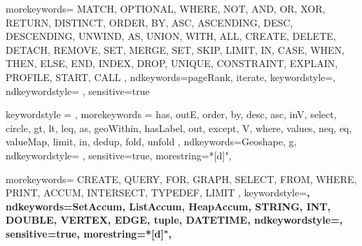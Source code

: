 \lstset{upquote=true}


{
    morekeywords={
		MATCH, OPTIONAL, WHERE, NOT, AND, OR, XOR, RETURN, DISTINCT, ORDER, BY, ASC, ASCENDING, DESC, DESCENDING, UNWIND, AS, UNION, WITH, ALL, CREATE, DELETE, DETACH, REMOVE, SET, MERGE, SET, SKIP, LIMIT, IN, CASE, WHEN, THEN, ELSE, END, INDEX, DROP, UNIQUE, CONSTRAINT, EXPLAIN, PROFILE, START, CALL
	},
    ndkeywords={pageRank, iterate},
    keywordstyle={\color{keyword}\bfseries},
    ndkeywordstyle= {\color{relation}},
    sensitive=true
}


{
    keywordstyle = {\color{keyword}},
    morekeywords = {
        has, outE, order, by, desc, asc, inV, select, circle, gt, lt, leq, as, geoWithin, hasLabel, out, except, V, where, values, neq, eq, valueMap, limit, in, dedup, fold, unfold
    },
    ndkeywords={Geoshape, g},
    ndkeywordstyle= {\color{relation}},
    sensitive=true,
    morestring=*[d]{"},
}


{
	morekeywords={
		CREATE, QUERY, FOR, GRAPH, SELECT, FROM, WHERE, PRINT, ACCUM, INTERSECT, TYPEDEF, LIMIT
	},
	keywordstyle=\color{keyword}\bfseries,
	ndkeywords={SetAccum, ListAccum, HeapAccum, STRING, INT, DOUBLE, VERTEX, EDGE, tuple, DATETIME},
    ndkeywordstyle=\color{relation},
    sensitive=true,
    morestring=*[d]{"},
}